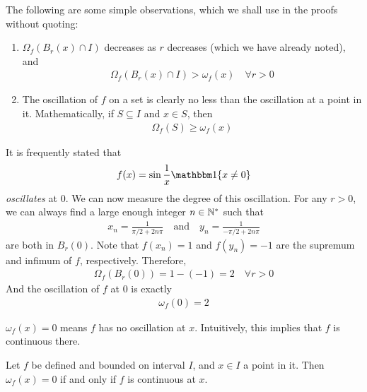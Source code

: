 \documentclass[thmcnt=section, 12pt]{my-elegantbook}
\begin{document}
The following are some simple observations,
which we shall use in the proofs without quoting:
\begin{enumerate}
    \item $\Omega_f(B_r(x) \cap I)$ decreases as $r$ decreases
          (which we have already noted),
          and
          \begin{align*}
              \Omega_f(B_r(x) \cap I) > \omega_f(x)
              \quad \forall r > 0
          \end{align*}
    \item The oscillation of $f$ on a set is clearly no less than
          the oscillation at a point in it.
          Mathematically, if $S \subseteq I$ and $x \in S$, then
          \begin{align*}
              \Omega_f(S) \geq \omega_f(x)
          \end{align*}
\end{enumerate}

\begin{example} \label{eg:16}
    It is frequently stated that
    \begin{align*}
        f(x) = \sin \frac{1}{x} \ind\{x \neq 0\}
    \end{align*}
    \textit{oscillates} at $0$.
    We can now measure the degree of this oscillation.
    For any $r > 0$,
    we can always find a large enough integer $n \in \mathbb{N}^\ast$
    such that
    \begin{align*}
        x_n = \frac{1}{\pi / 2 + 2n\pi}
        \quad \text{and} \quad
        y_n = \frac{1}{-\pi / 2 + 2n\pi}
    \end{align*}
    are both in $B_r(0)$.
    Note that $f(x_n) = 1$ and $f(y_n) = -1$
    are the supremum and infimum of $f$, respectively.
    Therefore,
    \begin{align*}
        \Omega_f(B_r(0)) = 1 - (-1) = 2
        \quad \forall r > 0
    \end{align*}
    And the oscillation of $f$ at $0$ is exactly
    \begin{align*}
        \omega_f(0) = 2
    \end{align*}
\end{example}


$\omega_f(x) = 0$ means $f$ has no oscillation at $x$.
Intuitively, this implies that $f$ is continuous there.

\begin{theorem} \label{thm:90}
    Let $f$ be defined and bounded on interval $I$,
    and $x \in I$ a point in it.
    Then $\omega_f(x) = 0$ if and only if $f$
    is continuous at $x$.
\end{theorem}
\end{document}
